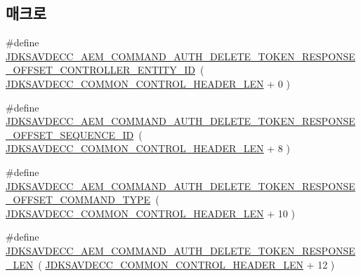 \subsection*{매크로}
\begin{DoxyCompactItemize}
\item 
\#define \hyperlink{group__command__auth__delete__token__response_ga390daada44f43e6a959c2b73806e7cd7}{J\+D\+K\+S\+A\+V\+D\+E\+C\+C\+\_\+\+A\+E\+M\+\_\+\+C\+O\+M\+M\+A\+N\+D\+\_\+\+A\+U\+T\+H\+\_\+\+D\+E\+L\+E\+T\+E\+\_\+\+T\+O\+K\+E\+N\+\_\+\+R\+E\+S\+P\+O\+N\+S\+E\+\_\+\+O\+F\+F\+S\+E\+T\+\_\+\+C\+O\+N\+T\+R\+O\+L\+L\+E\+R\+\_\+\+E\+N\+T\+I\+T\+Y\+\_\+\+ID}~( \hyperlink{group__jdksavdecc__avtp__common__control__header_gaae84052886fb1bb42f3bc5f85b741dff}{J\+D\+K\+S\+A\+V\+D\+E\+C\+C\+\_\+\+C\+O\+M\+M\+O\+N\+\_\+\+C\+O\+N\+T\+R\+O\+L\+\_\+\+H\+E\+A\+D\+E\+R\+\_\+\+L\+EN} + 0 )
\item 
\#define \hyperlink{group__command__auth__delete__token__response_gaee2b9e2790b9e33c1169d8980b30b36c}{J\+D\+K\+S\+A\+V\+D\+E\+C\+C\+\_\+\+A\+E\+M\+\_\+\+C\+O\+M\+M\+A\+N\+D\+\_\+\+A\+U\+T\+H\+\_\+\+D\+E\+L\+E\+T\+E\+\_\+\+T\+O\+K\+E\+N\+\_\+\+R\+E\+S\+P\+O\+N\+S\+E\+\_\+\+O\+F\+F\+S\+E\+T\+\_\+\+S\+E\+Q\+U\+E\+N\+C\+E\+\_\+\+ID}~( \hyperlink{group__jdksavdecc__avtp__common__control__header_gaae84052886fb1bb42f3bc5f85b741dff}{J\+D\+K\+S\+A\+V\+D\+E\+C\+C\+\_\+\+C\+O\+M\+M\+O\+N\+\_\+\+C\+O\+N\+T\+R\+O\+L\+\_\+\+H\+E\+A\+D\+E\+R\+\_\+\+L\+EN} + 8 )
\item 
\#define \hyperlink{group__command__auth__delete__token__response_gace1f2d0dc351ef5cce8a76092e83d227}{J\+D\+K\+S\+A\+V\+D\+E\+C\+C\+\_\+\+A\+E\+M\+\_\+\+C\+O\+M\+M\+A\+N\+D\+\_\+\+A\+U\+T\+H\+\_\+\+D\+E\+L\+E\+T\+E\+\_\+\+T\+O\+K\+E\+N\+\_\+\+R\+E\+S\+P\+O\+N\+S\+E\+\_\+\+O\+F\+F\+S\+E\+T\+\_\+\+C\+O\+M\+M\+A\+N\+D\+\_\+\+T\+Y\+PE}~( \hyperlink{group__jdksavdecc__avtp__common__control__header_gaae84052886fb1bb42f3bc5f85b741dff}{J\+D\+K\+S\+A\+V\+D\+E\+C\+C\+\_\+\+C\+O\+M\+M\+O\+N\+\_\+\+C\+O\+N\+T\+R\+O\+L\+\_\+\+H\+E\+A\+D\+E\+R\+\_\+\+L\+EN} + 10 )
\item 
\#define \hyperlink{group__command__auth__delete__token__response_ga600215ee1f8fa3622c1d54cc28c1f11f}{J\+D\+K\+S\+A\+V\+D\+E\+C\+C\+\_\+\+A\+E\+M\+\_\+\+C\+O\+M\+M\+A\+N\+D\+\_\+\+A\+U\+T\+H\+\_\+\+D\+E\+L\+E\+T\+E\+\_\+\+T\+O\+K\+E\+N\+\_\+\+R\+E\+S\+P\+O\+N\+S\+E\+\_\+\+L\+EN}~( \hyperlink{group__jdksavdecc__avtp__common__control__header_gaae84052886fb1bb42f3bc5f85b741dff}{J\+D\+K\+S\+A\+V\+D\+E\+C\+C\+\_\+\+C\+O\+M\+M\+O\+N\+\_\+\+C\+O\+N\+T\+R\+O\+L\+\_\+\+H\+E\+A\+D\+E\+R\+\_\+\+L\+EN} + 12 )
\end{DoxyCompactItemize}
